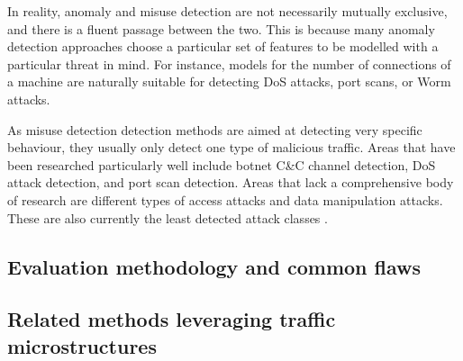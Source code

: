 
In reality, anomaly and misuse detection are not necessarily mutually exclusive, and there is a fluent passage between the two. This is because many anomaly detection approaches choose a particular set of features to be modelled with a particular threat in mind. For instance, models for the number of connections of a machine are naturally suitable for detecting DoS attacks, port scans, or Worm attacks. 

As misuse detection detection methods are aimed at detecting very specific behaviour, they usually only detect one type of malicious traffic. Areas that have been researched particularly well include botnet C\&C channel detection, DoS attack detection, and port scan detection. Areas that lack a comprehensive body of research are different types of access attacks and data manipulation attacks. These are also currently the least detected attack classes \cite{nisioti2018intrusion}.

\subsection{Evaluation methodology and common flaws}

\subsection{Related methods leveraging traffic microstructures}


